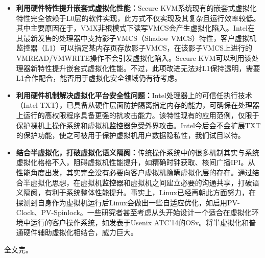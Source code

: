 \begin{itemize}
\item \textbf{利用硬件特性提升嵌套式虚拟化性能：}Secure KVM系统现有的嵌套式虚拟化特性完全依赖于L0层的软件实现，此方式不仅实现及其复杂且运行效率较低。其中主要原因在于，VMX非根模式下读写VMCS会产生虚拟化陷入。Intel在其最新发售的处理器中支持影子VMCS（Shadow VMCS）特性，客户虚拟机监控器（L1）可以指定某内存页存放影子VMCS，在该影子VMCS上进行的VMREAD/VMWRITE操作不会引发虚拟化陷入。Secure KVM可以利用该处理器新特性提升嵌套式虚拟化性能。不过，此项改进无法对L1保持透明，需要L1合作配合，能否用于虚拟化安全领域仍有待考虑。
\item \textbf{利用硬件机制解决虚拟化平台安全性问题：}Intel处理器上的可信任执行技术（Intel TXT），已具备从硬件层面防护隔离指定内存的能力，可确保在处理器上运行的高权限程序具备更强的抗攻击能力。该特性现有的应用范例，仅限于保护裸机上操作系统和虚拟机监控器免受外界攻击。Intel今后会不会扩展TXT的保护功能，使之可被用于保护虚拟机用户数据隐私性，我们试目以待。
\item \textbf{结合半虚拟化，打破虚拟化语义隔阂：}传统操作系统中的很多机制其实与系统虚拟化格格不入，阻碍虚拟机性能提升，如精确时钟获取、核间广播IPI。从性能角度出发，其实完全没有必要向客户虚拟机隐瞒虚拟化层的存在。通过结合半虚拟化思想，在虚拟机监控器和虚拟机之间建立必要的沟通共享，打破语义隔阂，有利于系统整体性能提升。事实上，Linux已经再朝此方面努力，在探测到自身作为虚拟机运行后Linux会做出一些自适应优化，如启用PV-Clock、PV-Spinlock。一些研究者甚至考虑从头开始设计一个适合在虚拟化环境中运行的客户操作系统，如发表于Usenix ATC'14的OSv\cite{osv}。将半虚拟化和普通硬件辅助虚拟化相结合，威力巨大。
\end{itemize}

全文完。




